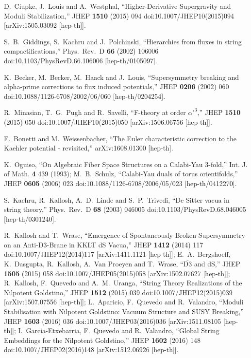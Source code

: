 \documentclass[11pt,a4paper]{article}
\begin{document}
\begin{thebibliography}{99}
  D.~Ciupke, J.~Louis and A.~Westphal,
  ``Higher-Derivative Supergravity and Moduli Stabilization,''
  JHEP {\bf 1510} (2015) 094
  doi:10.1007/JHEP10(2015)094
  [arXiv:1505.03092 [hep-th]].

  S.~B.~Giddings, S.~Kachru and J.~Polchinski,
  ``Hierarchies from fluxes in string compactifications,''
  Phys.\ Rev.\ D {\bf 66} (2002) 106006
  doi:10.1103/PhysRevD.66.106006
  [hep-th/0105097].

  K.~Becker, M.~Becker, M.~Haack and J.~Louis,
  ``Supersymmetry breaking and alpha-prime corrections to flux induced potentials,''
  JHEP {\bf 0206} (2002) 060
  doi:10.1088/1126-6708/2002/06/060
  [hep-th/0204254].

  R.~Minasian, T.~G.~Pugh and R.~Savelli,
  ``F-theory at order $\alpha'^3$,''
  JHEP {\bf 1510} (2015) 050
  doi:10.1007/JHEP10(2015)050
  [arXiv:1506.06756 [hep-th]].

  F.~Bonetti and M.~Weissenbacher,
  ``The Euler characteristic correction to the Kaehler potential - revisited,''
  arXiv:1608.01300 [hep-th].

  K.~Oguiso,
  ``On Algebraic Fiber Space Structures on a Calabi-Yau 3-fold,''
	Int. J. of Math. {\bf 4} 439 (1993);
	M.~B.~Schulz,
  ``Calabi-Yau duals of torus orientifolds,''
  JHEP {\bf 0605} (2006) 023
  doi:10.1088/1126-6708/2006/05/023
  [hep-th/0412270].

  S.~Kachru, R.~Kallosh, A.~D.~Linde and S.~P.~Trivedi,
  ``De Sitter vacua in string theory,''
  Phys.\ Rev.\ D {\bf 68} (2003) 046005
  doi:10.1103/PhysRevD.68.046005
  [hep-th/0301240].

  R.~Kallosh and T.~Wrase,
  ``Emergence of Spontaneously Broken Supersymmetry on an Anti-D3-Brane in KKLT dS Vacua,''
  JHEP {\bf 1412} (2014) 117
  doi:10.1007/JHEP12(2014)117
  [arXiv:1411.1121 [hep-th]]; 
   E.~A.~Bergshoeff, K.~Dasgupta, R.~Kallosh, A.~Van Proeyen and T.~Wrase,
  ``$ \overline{\mathrm{D}3} $ and dS,''
  JHEP {\bf 1505} (2015) 058
  doi:10.1007/JHEP05(2015)058
  [arXiv:1502.07627 [hep-th]];
  R.~Kallosh, F.~Quevedo and A.~M.~Uranga,
  ``String Theory Realizations of the Nilpotent Goldstino,''
  JHEP {\bf 1512} (2015) 039
  doi:10.1007/JHEP12(2015)039
  [arXiv:1507.07556 [hep-th]];
  L.~Aparicio, F.~Quevedo and R.~Valandro,
  ``Moduli Stabilisation with Nilpotent Goldstino: Vacuum Structure and SUSY Breaking,''
  JHEP {\bf 1603} (2016) 036
  doi:10.1007/JHEP03(2016)036
  [arXiv:1511.08105 [hep-th]];
   I.~García-Etxebarria, F.~Quevedo and R.~Valandro,
  ``Global String Embeddings for the Nilpotent Goldstino,''
  JHEP {\bf 1602} (2016) 148
  doi:10.1007/JHEP02(2016)148
  [arXiv:1512.06926 [hep-th]].


\end{thebibliography}
\end{document}
